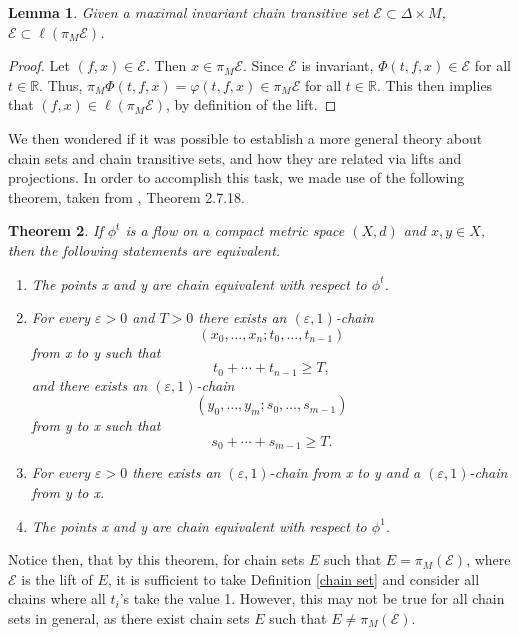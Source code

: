 \documentclass[11pt]{article}
\newtheorem{thm}{Theorem}
\newtheorem{lem}[thm]{Lemma}
\begin{document}
\begin{lem}\label{chain set subset}
Given a maximal invariant chain transitive set $\mathcal{E}\subset \Delta\times M$, $\mathcal{E}\subset\ell(\pi_M\mathcal{E})$.
\end{lem}
\begin{proof}
Let $(f,x)\in\mathcal{E}$.  Then $x\in \pi_M\mathcal{E}$.  Since $\mathcal{E}$ is invariant, $\Phi(t,f,x)\in \mathcal{E}$ for all $t\in\mathbb{R}$.  Thus, $\pi_M\Phi(t,f,x)=\varphi(t,f,x)\in\pi_M\mathcal{E}$ for all $t\in\mathbb{R}$.  This then implies that $(f,x)\in\ell(\pi_M\mathcal{E})$, by definition of the lift. 
\end{proof}


We then wondered if it was possible to establish a more general theory about chain sets and chain transitive sets, and how they are related via lifts and projections.  In order to accomplish this task, we made use of the following theorem, taken from \cite{Alongi}, Theorem 2.7.18.


\begin{thm}\label{h flow}
If $\phi^t$ is a flow on a compact metric space $(X,d)$ and $x,y\in X$, then the following statements are equivalent.
\begin{enumerate}
\item The points x and y are chain equivalent with respect to $\phi^t$.
\item For every $\varepsilon>0$ and $T>0$ there exists an $(\varepsilon,1)$-chain
$$(x_0,\ldots,x_n;t_0,\ldots,t_{n-1})$$
from x to y such that 
$$t_0+\cdots+t_{n-1}\geq T,$$
and there exists an $(\varepsilon,1)$-chain 
$$(y_0,\ldots,y_m;s_0,\ldots,s_{m-1})$$
from y to x such that
$$s_0+\cdots+s_{m-1}\geq T.$$
\item For every $\varepsilon>0$ there exists an $(\varepsilon,1)$-chain from x to y and a $(\varepsilon,1)$-chain from y to x.
\item The points x and y are chain equivalent with respect to $\phi^1$.
\end{enumerate}
\end{thm}

Notice then, that by this theorem, for chain sets $E$ such that $E=\pi_M(\mathcal{E})$, where $\mathcal{E}$ is the lift of $E$, it is sufficient to take Definition \ref{chain set} and consider all chains where all $t_i$'s take the value 1.  However, this may not be true for all chain sets in general, as there exist chain sets $E$ such that $E\not=\pi_M(\mathcal{E})$.  
\end{document}
